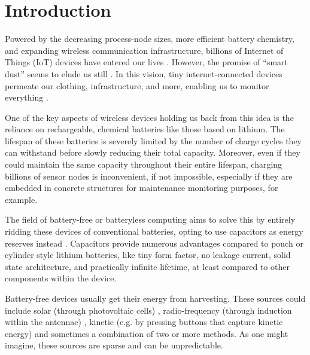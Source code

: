 \chapter{Introduction}
\label{chp:introduction}

\nocite{*}

Powered by the decreasing process-node sizes, more efficient battery chemistry, and expanding wireless communication infrastructure, billions of Internet of Things (IoT) devices have entered our lives \cite{arif_2021, microsoft_2019}. However, the promise of ``smart dust'' seems to elude us still \cite{hester_2017}. In this vision, tiny internet-connected devices permeate our clothing, infrastructure, and more, enabling us to monitor everything \cite{marr_2018}.

One of the key aspects of wireless devices holding us back from this idea is the reliance on rechargeable, chemical batteries like those based on lithium. The lifespan of these batteries is severely limited by the number of charge cycles they can withstand before slowly reducing their total capacity. Moreover, even if they could maintain the same capacity throughout their entire lifespan, charging billions of sensor nodes is inconvenient, if not impossible, especially if they are embedded in concrete structures for maintenance monitoring purposes, for example.

The field of battery-free or batteryless computing aims to solve this by entirely ridding these devices of conventional batteries, opting to use capacitors as energy reserves instead \cite{freebie, hester_2017, satya_2019}. Capacitors provide numerous advantages compared to pouch or cylinder style lithium batteries, like tiny form factor, no leakage current, solid state architecture, and practically infinite lifetime, at least compared to other components within the device. 

Battery-free devices usually get their energy from harvesting. These sources could include solar (through photovoltaic cells) \cite{gameboy, colin_2018}, radio-frequency (through induction within the antennae) \cite{gollakota_2014, wisp_2005}, kinetic (e.g. by pressing buttons that capture kinetic energy) \cite{gameboy} and sometimes a combination of two or more methods. As one might imagine, these sources are sparse and can be unpredictable. 


